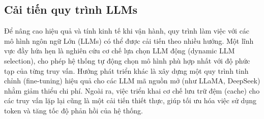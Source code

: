 \subsection{Cải tiến quy trình LLMs}
Để nâng cao hiệu quả và tính kinh tế khi vận hành, quy trình làm việc với các mô hình ngôn ngữ Lớn (LLMs) có thể được cải tiến theo nhiều hướng. Một lĩnh vực đầy hứa hẹn là nghiên cứu cơ chế lựa chọn LLM động (dynamic LLM selection), cho phép hệ thống tự động chọn mô hình phù hợp nhất với độ phức tạp của từng truy vấn. Hướng phát triển khác là xây dựng một quy trình tinh chỉnh (fine-tuning) hiệu quả cho các LLM mã nguồn mở (như LLaMA, DeepSeek) nhằm giảm thiểu chi phí. Ngoài ra, việc triển khai cơ chế lưu trữ đệm (cache) cho các truy vấn lặp lại cũng là một cải tiến thiết thực, giúp tối ưu hóa việc sử dụng token và tăng tốc độ phản hồi của hệ thống.

